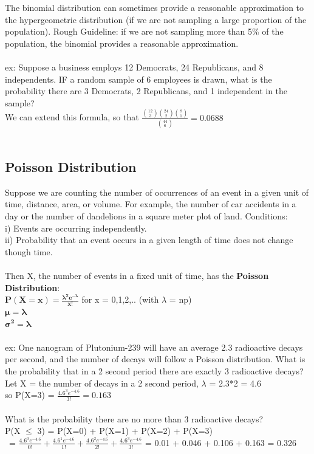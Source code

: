 \documentclass[12pt, a4paper]{article}
\begin{document}
	\noindent The binomial distribution can sometimes provide a reasonable approximation to the hypergeometric distribution (if we are not sampling a large proportion of the population). Rough Guideline: if we are not sampling more than 5\% of the population, the binomial provides a reasonable approximation. \\~\\	
	\noindent ex: Suppose a business employs 12 Democrats, 24 Republicans, and 8 independents. IF a random sample of 6 employees is drawn, what is the probability there are 3 Democrats, 2 Republicans, and 1 independent in the sample? \\
	We can extend this formula, so that $\frac{\binom{12}{3}\binom{24}{2}\binom{8}{1}}{\binom{44}{6}} = 0.0688$ \\~\\
	
	\subsection{Poisson Distribution}
	Suppose we are counting the number of occurrences of an event in a given unit of time, distance, area, or volume. For example, the number of car accidents in a day or the number of dandelions in a square meter plot of land. \newpage
	\noindent Conditions: \\
	i) Events are occurring independently. \\
	ii) Probability that an event occurs in a given length of time does not change though time. \\~\\
	Then X, the number of events in a fixed unit of time, has the \textbf{Poisson Distribution}: \\
	$\mathbf{P(X = x) = \frac{\lambda^xe^{-\lambda}}{x!}}$ for x = 0,1,2,.. (with $\lambda$ = np)\\
	$\mathbf{\mu = \lambda}$ \\
	$\mathbf{\sigma^2 = \lambda}$ \\~\\
	ex: One nanogram of Plutonium-239 will have an average 2.3 radioactive decays per second, and the number of decays will follow a Poisson distribution. What is the probability that in a 2 second period there are exactly 3 radioactive decays? \\
	Let X = the number of decays in a 2 second period, $\lambda$ = 2.3*2 = 4.6 \\
	so P(X=3) = $\frac{4.6^3e^{-4.6}}{3!} = 0.163$ \\~\\
	What is the probability there are no more than 3 radioactive decays? \\
	P(X $\leq$ 3) = P(X=0) + P(X=1) + P(X=2) + P(X=3) \\\
	= $\frac{4.6^0e^{-4.6}}{0!} + \frac{4.6^1e^{-4.6}}{1!} + \frac{4.6^2e^{-4.6}}{2!} + \frac{4.6^3e^{-4.6}}{3!}$ = 0.01 + 0.046 + 0.106 + 0.163 = 0.326 \\~\\
	
\end{document}
